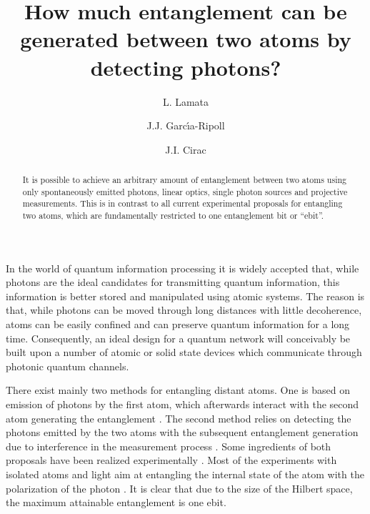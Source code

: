 \documentclass[aps,prl,twocolumn,superscriptaddress,showpacs,nofootonbib]{revtex4}
\begin{document}
\title{How much entanglement can be generated between two atoms by detecting photons?}


\author{L. Lamata}
 


\author{J.J. Garc\'{\i}a-Ripoll}

\author{J.I. Cirac}



\begin{abstract}
  It is possible to achieve an arbitrary amount of entanglement
  between two atoms using only spontaneously emitted photons, linear
  optics, single photon sources and projective measurements. This is
  in contrast to all current experimental proposals for entangling two
  atoms, which are fundamentally restricted to one entanglement bit
  or ``ebit''.
\end{abstract}


\maketitle

In the world of quantum information processing it is widely accepted
that, while photons are the ideal candidates for transmitting quantum
information, this information is better stored and manipulated using
atomic systems. The reason is that, while photons can be moved through
long distances with little decoherence, atoms can be easily confined
and can preserve quantum information for a long time.  Consequently,
an ideal design for a quantum network will conceivably be built upon a
number of atomic or solid state devices which communicate through
photonic quantum channels.

There exist mainly two methods for entangling distant atoms. One is
based on emission of photons by the first atom, which afterwards
interact with the second atom generating the entanglement
\cite{CirZolKimMab97,EnkCirZol97,GheSaaTorCirZol98,ParKim00,ChaLawEbe02,ChaLawEbe03}.
The second method relies on detecting the photons emitted by the two
atoms with the subsequent entanglement generation due to
interference in the measurement process
\cite{Cabrillo99,BosKniPleVed99}. Some ingredients of both proposals
have been realized experimentally
\cite{Polzik01,Rempe02,Kimble04,Blinov04,Volz05,Kuzmich06,Grangier06,Maunz06,Kimble05,Darquie06}.
Most of the experiments with isolated atoms and light aim at
entangling the internal state of the atom with the polarization of
the photon
\cite{Rempe02,Kimble04,Blinov04,Volz05,Kuzmich06,Grangier06,Maunz06,Darquie06}.
It is clear that due to the size of the Hilbert space, the maximum
attainable entanglement is one ebit.
\end{document}

